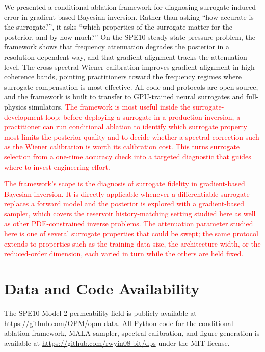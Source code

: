 \documentclass[12pt]{article}
\newcommand{\add}[1]{\textcolor{red}{#1}}
\begin{document}
We presented a conditional ablation framework for diagnosing surrogate-induced error in gradient-based Bayesian inversion. Rather than asking ``how accurate is the surrogate?'', it asks ``which properties of the surrogate matter for the posterior, and by how much?'' On the SPE10 steady-state pressure problem, the framework shows that frequency attenuation degrades the posterior in a resolution-dependent way, and that gradient alignment tracks the attenuation level. The cross-spectral Wiener calibration improves gradient alignment in high-coherence bands, pointing practitioners toward the frequency regimes where surrogate compensation is most effective. All code and protocols are open source, and the framework is built to transfer to GPU-trained neural surrogates and full-physics simulators. \add{The framework is most useful inside the surrogate-development loop: before deploying a surrogate in a production inversion, a practitioner can run conditional ablation to identify which surrogate property most limits the posterior quality and to decide whether a spectral correction such as the Wiener calibration is worth its calibration cost. This turns surrogate selection from a one-time accuracy check into a targeted diagnostic that guides where to invest engineering effort.}

\add{The framework's scope is the diagnosis of surrogate fidelity in gradient-based Bayesian inversion. It is directly applicable whenever a differentiable surrogate replaces a forward model and the posterior is explored with a gradient-based sampler, which covers the reservoir history-matching setting studied here as well as other PDE-constrained inverse problems. The attenuation parameter studied here is one of several surrogate properties that could be swept; the same protocol extends to properties such as the training-data size, the architecture width, or the reduced-order dimension, each varied in turn while the others are held fixed.}

\section*{Data and Code Availability}

The SPE10 Model 2 permeability field is publicly available at \url{https://github.com/OPM/opm-data}. All Python code for the conditional ablation framework, MALA sampler, spectral calibration, and figure generation is available at \url{https://github.com/rwyin08-bit/dps} under the MIT license.
\end{document}
